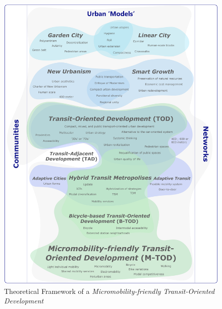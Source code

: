 \begin{refsegment}
\begin{figure}[h!]\vspace*{4pt}
        \caption*{Theoretical Framework of a \textsl{Micromobility-friendly Transit-Oriented Development}}
        \label{graphical-abstract-chap1}
        \centerline{\includegraphics[width=1\columnwidth]{src/Figures/Graphical-abstract/EN_Graphical_abstract_chap1.pdf}}
        \vspace{5pt}
    \end{figure}
    

\end{refsegment}

